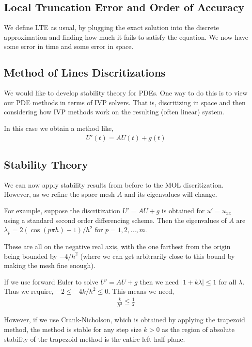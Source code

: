 \documentclass[12pt]{article}
\begin{document}
\subsection{Local Truncation Error and Order of Accuracy}
We define LTE as usual, by plugging the exact solution into the discrete approximation and finding how much it fails to satisfy the equation. We now have some error in time and some error in space.

\subsection{Method of Lines Discritizations}
We would like to develop stability theory for PDEs. One way to do this is to view our PDE methods in terms of IVP solvers. That is, discritizing in space and then considering how IVP methods work on the resulting (often linear) system.

In this case we obtain a method like,
\begin{align*}
    U'(t) = AU(t) + g(t)
\end{align*}

\subsection{Stability Theory}
We can now apply stability results from before to the MOL discritization. However, as we refine the space mesh \( A \) and its eigenvalues will change.

For example, suppose the discritization \( U' = AU + g \) is obtained for \( u' = u_{xx} \) using a standard second order differencing scheme. Then the eigenvalues of \( A \) are \( \lambda_p = 2(\cos(p\pi h)-1)/h^2 \) for \( p=1,2,\ldots, m \).

These are all on the negative real axis, with the one farthest from the origin being bounded by \( -4/h^2 \) (where we can get arbitrarily close to this bound by making the mesh fine enough).

If we use forward Euler to solve \( U' = AU + g \) then we need \(|1+k\lambda|\leq 1 \) for all \( \lambda \). Thus we require, \( -2\leq -4k/h^2 \leq 0 \). This means we need,
\begin{align*}
    \frac{k}{h^2} \leq \frac{1}{2}
\end{align*}

However, if we use Crank-Nicholson, which is obtained by applying the trapezoid method, the method is stable for any step size \( k > 0 \) as the region of absolute stability of the trapezoid method is the entire left half plane.
\end{document}

